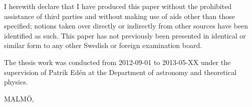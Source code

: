 


\begin{declaration}        %

I herewith declare that I have produced this paper without the prohibited assistance of third parties and without making use of aids other than those specified; notions taken over directly or indirectly from other sources have been identified as such. This paper has not previously been presented in identical or similar form to any other Swedish or foreign examination board.

The thesis work was conducted from 2012-09-01 to 2013-05-XX under the supervision of Patrik Edén at the Department of astronomy and theoretical physics.

\vspace{10mm}

MALMÖ,


\end{declaration}


